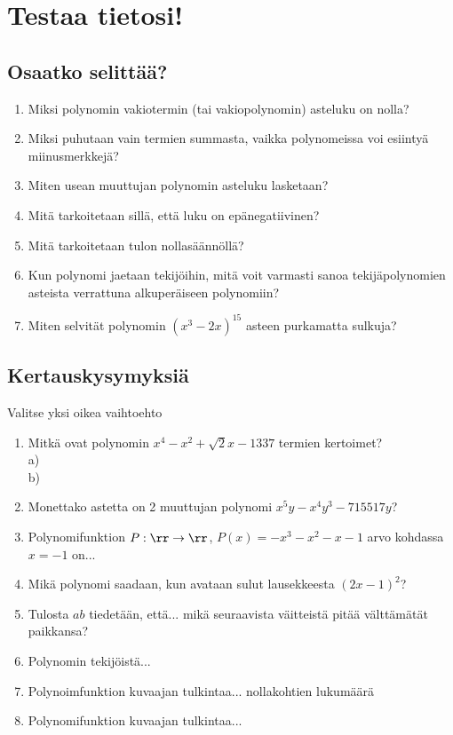 
\section{Testaa tietosi!}

\subsection*{Osaatko selittää?}

\begin{enumerate}

\item Miksi polynomin vakiotermin (tai vakiopolynomin) asteluku on nolla?
\item Miksi puhutaan vain termien summasta, vaikka polynomeissa voi esiintyä miinusmerkkejä?
\item Miten usean muuttujan polynomin asteluku lasketaan?
\item Mitä tarkoitetaan sillä, että luku on epänegatiivinen?
\item Mitä tarkoitetaan tulon nollasäännöllä?
\item Kun polynomi jaetaan tekijöihin, mitä voit varmasti sanoa tekijäpolynomien asteista verrattuna alkuperäiseen polynomiin?
\item Miten selvität polynomin $(x^3-2x)^{15}$ asteen purkamatta sulkuja?


\end{enumerate}

\subsection*{Kertauskysymyksiä}

Valitse yksi oikea vaihtoehto

\begin{enumerate}

\item Mitkä ovat polynomin $x^4-x^2+\sqrt{2}x-1337$ termien kertoimet? \\
a) \\
b) \\ %

\item Monettako astetta on 2 muuttujan polynomi $x^5y-x^4y^3-715517y$?

\item Polynomifunktion $P:\rr \rightarrow \rr$, $P(x)=-x^3-x^2-x-1$ arvo kohdassa $x=-1$ on...
\item Mikä polynomi saadaan, kun avataan sulut lausekkeesta $(2x-1)^2$?
\item Tulosta $ab$ tiedetään, että... mikä seuraavista väitteistä pitää välttämätät paikkansa?
\item Polynomin tekijöistä...
\item Polynoimfunktion kuvaajan tulkintaa... nollakohtien lukumäärä
\item Polynomifunktion kuvaajan tulkintaa...

\end{enumerate}


